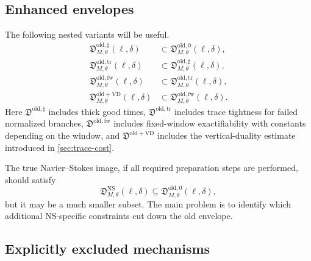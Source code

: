 \documentclass[11pt]{article}
\numberwithin{equation}{section}
\newcommand{\old}{\mathrm{old}}
\newcommand{\trc}{\mathrm{tr}}
\newcommand{\NS}{\mathrm{NS}}
\newcommand{\VD}{\mathrm{VD}}
\newcommand{\frakD}{\mathfrak D}
\begin{document}
\subsection{Enhanced envelopes}

The following nested variants will be useful.
\begin{align*}
\frakD^{\old,\sharp}_{M,\theta}(\ell,\delta)&\subset\frakD^{\old,0}_{M,\theta}(\ell,\delta),\\
\frakD^{\old,\trc}_{M,\theta}(\ell,\delta)&\subset\frakD^{\old,\sharp}_{M,\theta}(\ell,\delta),\\
\frakD^{\old,\mathrm{fw}}_{M,\theta}(\ell,\delta)&\subset\frakD^{\old,\trc}_{M,\theta}(\ell,\delta),\\
\frakD^{\old+\VD}_{M,\theta}(\ell,\delta)&\subset\frakD^{\old,\mathrm{fw}}_{M,\theta}(\ell,\delta).
\end{align*}
Here \(\frakD^{\old,\sharp}\) includes thick good times, \(\frakD^{\old,\trc}\) includes trace tightness for failed normalized branches, \(\frakD^{\old,\mathrm{fw}}\) includes fixed-window exactifiability with constants depending on the window, and \(\frakD^{\old+\VD}\) includes the vertical-duality estimate introduced in \cref{sec:trace-cost}.

The true Navier--Stokes image, if all required preparation steps are performed, should satisfy
\begin{equation}\label{eq:envelope-inclusion}
\frakD^{\NS}_{M,\theta}(\ell,
\delta)
\subseteq
\frakD^{\old,0}_{M,\theta}(\ell,
\delta),
\end{equation}
but it may be a much smaller subset.  The main problem is to identify which additional \(\NS\)-specific constraints cut down the old envelope.

\subsection{Explicitly excluded mechanisms}
\end{document}
